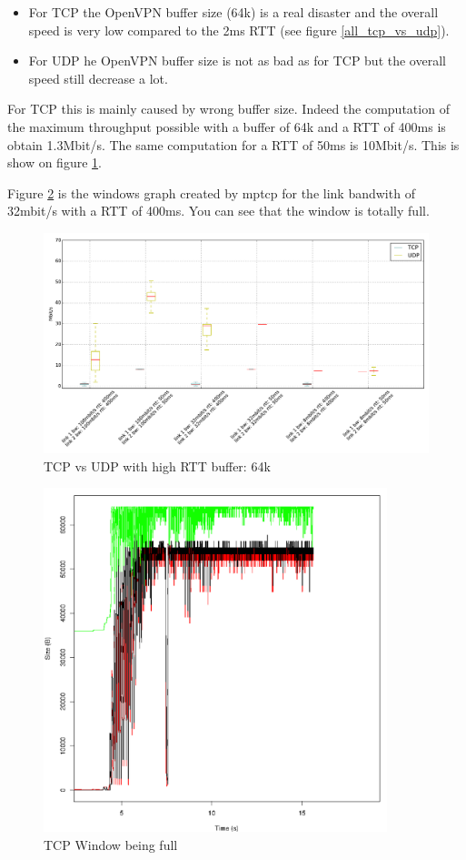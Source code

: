 \begin{itemize}
\item For TCP the OpenVPN buffer size (64k) is a real disaster and the overall speed is very low compared to the 2ms RTT (see figure \ref{all_tcp_vs_udp}).
\item For UDP he OpenVPN buffer size is not as bad as for TCP but the overall speed still decrease a lot.
\end{itemize}

For TCP this is mainly caused by wrong buffer size. Indeed the computation of the maximum throughput possible with a buffer of 64k and a RTT of 400ms
is obtain 1.3Mbit/s. The same computation for a RTT of 50ms is 10Mbit/s. This is show on figure \ref{tcp_vs_udp_200ms}.

Figure \ref{window_tcp_32_50_full} is the windows graph created by mptcp for the link bandwith of 32mbit/s with a RTT of 400ms. You can see that the window is totally full.

\begin{figure}[h!]
 \centering
 \includegraphics[width=1\textwidth]{../results/all_tcp_vs_udp_200ms.pdf}
 \caption{TCP vs UDP with high RTT buffer: 64k}
 \label{tcp_vs_udp_200ms}
\end{figure}

\begin{figure}[h!]
 \centering
 \includegraphics[width=10cm]{../results/window_tcp_32_50_full.pdf}
 \caption{TCP Window being full}
 \label{window_tcp_32_50_full}
\end{figure}

